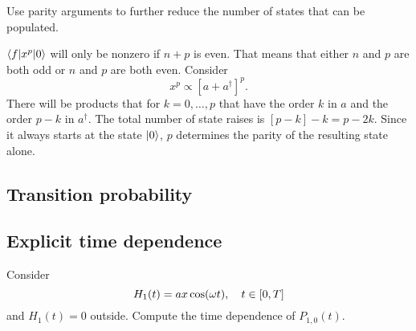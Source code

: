 \documentclass[11pt, english, fleqn, DIV=15, headinclude, BCOR=1.5cm]{scrartcl}
\begin{document}
\begin{problem}
    Use parity arguments to further reduce the number of states that can be
    populated.
\end{problem}

$\braket{f | x^p | 0}$ will only be nonzero if $n + p$ is even. That means that
either $n$ and $p$ are both odd or $n$ and $p$ are both even. Consider
\[
    x^p \propto [a + a^\dagger]^p.
\]
There will be products that for $k = 0, \ldots, p$ that have the order $k$ in
$a$ and the order $p-k$ in $a^\dagger$. The total number of state raises is
$[p-k] - k = p - 2k$. Since it always starts at the state $\ket 0$, $p$
determines the parity of the resulting state alone.

\subsection{Transition probability}

\subsection{Explicit time dependence}

\begin{problem}
    Consider
    \[
        H_1(t) = a x \cos(\omega t)
        ,\quad
        t \in [0, T]
    \]
    and $H_1(t) = 0$ outside. Compute the time dependence of $P_{1,0}(t)$.
\end{problem}
\end{document}
